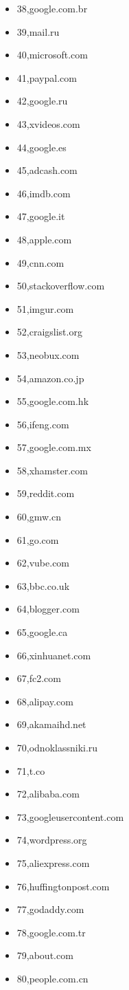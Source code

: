 \begin{multicols}{3}
\begin{itemize}
	\item 38,google.com.br
	\item 39,mail.ru
	\item 40,microsoft.com
	\item 41,paypal.com
	\item 42,google.ru
	\item 43,xvideos.com
	\item 44,google.es
	\item 45,adcash.com
	\item 46,imdb.com
	\item 47,google.it
	\item 48,apple.com
	\item 49,cnn.com
	\item 50,stackoverflow.com
	\item 51,imgur.com
	\item 52,craigslist.org
	\item 53,neobux.com
	\item 54,amazon.co.jp
	\item 55,google.com.hk
	\item 56,ifeng.com
	\item 57,google.com.mx
	\item 58,xhamster.com
	\item 59,reddit.com
	\item 60,gmw.cn
	\item 61,go.com
	\item 62,vube.com
	\item 63,bbc.co.uk
	\item 64,blogger.com
	\item 65,google.ca
	\item 66,xinhuanet.com
	\item 67,fc2.com
	\item 68,alipay.com
	\item 69,akamaihd.net
	\item 70,odnoklassniki.ru
	\item 71,t.co
	\item 72,alibaba.com
	\item 73,googleusercontent.com
	\item 74,wordpress.org
	\item 75,aliexpress.com
	\item 76,huffingtonpost.com
	\item 77,godaddy.com
	\item 78,google.com.tr
	\item 79,about.com
	\item 80,people.com.cn

\end{itemize}
\end{multicols}
